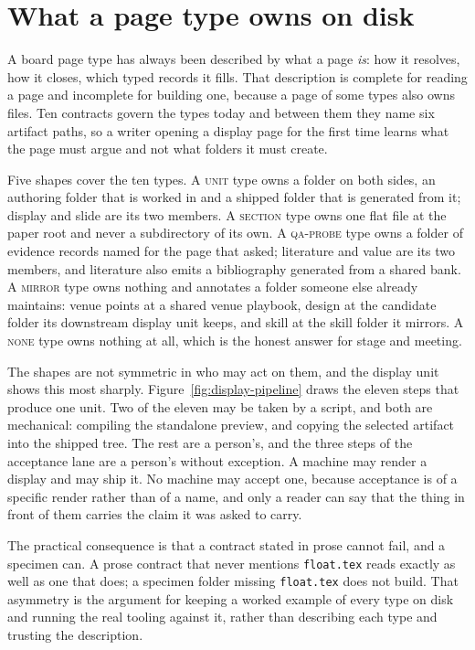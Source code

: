 \section{What a page type owns on disk}
\label{sec:page-types}

A board page type has always been described by what a page \emph{is}: how it
resolves, how it closes, which typed records it fills. That description is
complete for reading a page and incomplete for building one, because a page of
some types also owns files. Ten contracts govern the types today and between
them they name six artifact paths, so a writer opening a display page for the
first time learns what the page must argue and not what folders it must create.

Five shapes cover the ten types. A \textsc{unit} type owns a folder on both
sides, an authoring folder that is worked in and a shipped folder that is
generated from it; display and slide are its two members. A \textsc{section}
type owns one flat file at the paper root and never a subdirectory of its own.
A \textsc{qa-probe} type owns a folder of evidence records named for the page
that asked; literature and value are its two members, and literature also emits
a bibliography generated from a shared bank. A \textsc{mirror} type owns nothing
and annotates a folder someone else already maintains: venue points at a shared
venue playbook, design at the candidate folder its downstream display unit keeps,
and skill at the skill folder it mirrors. A \textsc{none} type owns nothing at
all, which is the honest answer for stage and meeting.

The shapes are not symmetric in who may act on them, and the display unit shows
this most sharply. Figure~\ref{fig:display-pipeline} draws the eleven steps that
produce one unit. Two of the eleven may be taken by a script, and both are
mechanical: compiling the standalone preview, and copying the selected artifact
into the shipped tree. The rest are a person's, and the three steps of the
acceptance lane are a person's without exception. A machine may render a display
and may ship it. No machine may accept one, because acceptance is of a specific
render rather than of a name, and only a reader can say that the thing in front
of them carries the claim it was asked to carry.



The practical consequence is that a contract stated in prose cannot fail, and a
specimen can. A prose contract that never mentions \texttt{float.tex} reads
exactly as well as one that does; a specimen folder missing \texttt{float.tex}
does not build. That asymmetry is the argument for keeping a worked example of
every type on disk and running the real tooling against it, rather than
describing each type and trusting the description.
